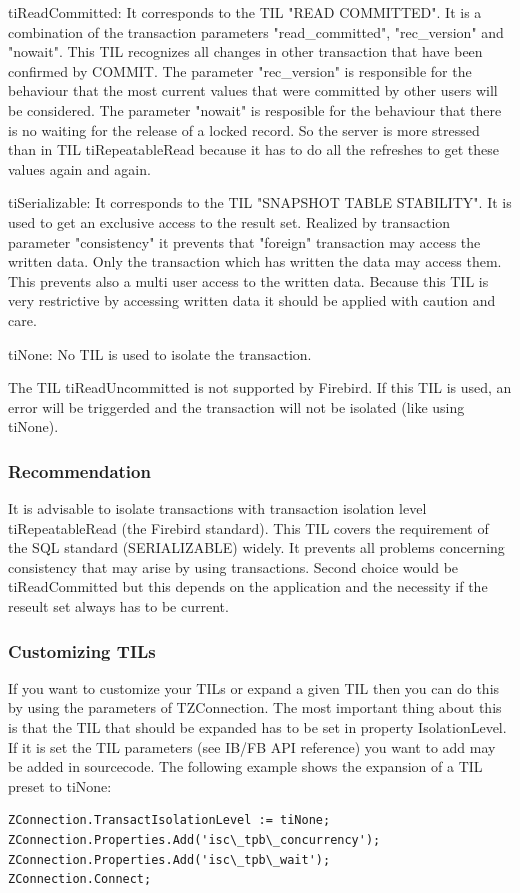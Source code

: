 \documentclass[a4paper,12pt,oneside]{book}
\begin{document}
tiReadCommitted:
It corresponds to the TIL "READ COMMITTED".
It is a combination of the transaction parameters "read\_committed", "rec\_version" and "nowait".
This TIL recognizes all changes in other transaction that have been confirmed by COMMIT.
The parameter "rec\_version" is responsible for the behaviour that the most current values that were committed by other users will be considered.
The parameter "nowait" is resposible for the behaviour that there is no waiting for the release of a locked record.
So the server is more stressed than in TIL tiRepeatableRead because it has to do all the refreshes to get these values again and again.

tiSerializable:
It corresponds to the TIL "SNAPSHOT TABLE STABILITY".
It is used to get an exclusive access to the result set.
Realized by transaction parameter "consistency" it prevents that "foreign" transaction may access the written data.
Only the transaction which has written the data may access them.
This prevents also a multi user access to the written data.
Because this TIL is very restrictive by accessing written data it should be applied with caution and care.

tiNone: No TIL is used to isolate the transaction.

The TIL tiReadUncommitted is not supported by Firebird.
If this TIL is used, an error will be triggerded and the transaction will not be isolated (like using tiNone).

\subsubsection{Recommendation}
It is advisable to isolate transactions with transaction isolation level tiRepeatableRead (the Firebird standard).
This TIL covers the requirement of the SQL standard (SERIALIZABLE) widely.
It prevents all problems concerning consistency that may arise by using transactions.
Second choice would be tiReadCommitted but this depends on the application and the necessity if the reseult set always has to be current.

\subsubsection{Customizing TILs}

If you want to customize your TILs or expand a given TIL then you can do this by using the parameters of TZConnection.
The most important thing about this is that the TIL that should be expanded has to be set in
property IsolationLevel.
If it is set the TIL parameters (see IB/FB API reference) you want to add may be added in sourcecode.
The following example shows the expansion of a TIL preset to tiNone:
\begin{verbatim}
ZConnection.TransactIsolationLevel := tiNone;
ZConnection.Properties.Add('isc\_tpb\_concurrency');
ZConnection.Properties.Add('isc\_tpb\_wait');
ZConnection.Connect;
\end{verbatim}
\end{document}
